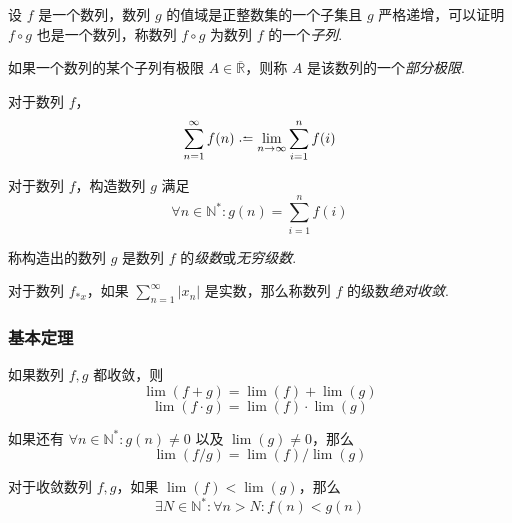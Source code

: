\begin{definition}
    设 $f$ 是一个数列，数列 $g$ 的值域是正整数集的一个子集且 $g$ 严格递增，可以证明 $f\circ g$ 也是一个数列，称数列 $f \circ g$ 为数列 $f$ 的一个\emph{子列}.
\end{definition}\vspace{9pt}

\begin{definition}
    如果一个数列的某个子列有极限 $A \in \overline{\mathbb{R}}$，则称 $A$ 是该数列的一个\emph{部分极限}.
\end{definition}\vspace{9pt}

\begin{definition}
    对于数列 $f$，
    \[\sum_{n=1}^{\infty} f(n) \defeq \lim_{n \rightarrow \infty} \sum_{i=1}^{n} f(i)\]
\end{definition}\vspace{9pt}

\begin{definition}
    对于数列 $f$，构造数列 $g$ 满足
    \[\forall n\in \mathbb{N}^*: g(n) = \sum_{i=1}^{n} f(i)\]
    
    称构造出的数列 $g$ 是数列 $f$ 的\emph{级数}或\emph{无穷级数}.
\end{definition}\vspace{9pt}

\begin{definition}
    对于数列 $f_{*x}$，如果 $\displaystyle \sum_{n=1}^{\infty} \lvert x_n\rvert$ 是实数，那么称数列 $f$ 的级数\emph{绝对收敛}.
\end{definition}

\subsubsection{基本定理}
\begin{theorem}
    如果数列 $f,g$ 都收敛，则
    \[\lim(f+g) = \lim(f) + \lim(g)\]
    \[\lim(f \cdot g) = \lim(f) \cdot \lim(g)\]

    如果还有 $\forall n \in \mathbb{N}^*: g(n) \neq 0$ 以及 $\lim(g) \neq 0$，那么
    \[\lim(f/g) = \lim(f)/\lim(g)\]
\end{theorem}\vspace{9pt}

\begin{theorem}
    对于收敛数列 $f,g$，如果 $\lim(f) < \lim(g)$，那么
    \[\exists N \in \mathbb{N}^*: \forall n > N: f(n) < g(n)\]
\end{theorem}\vspace{9pt}

